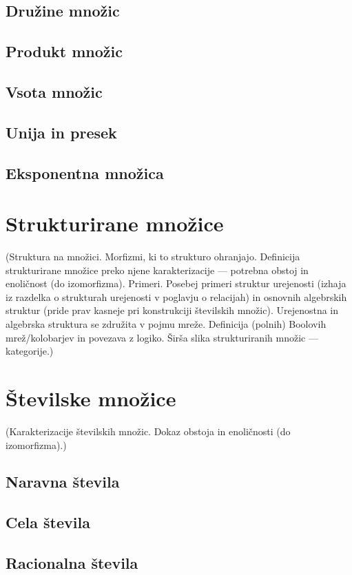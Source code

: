 \documentclass[11pt,a4paper,twoside]{book}
\newcommand{\note}[1]{{\small\textcolor{notecolor}{(#1)}}}
\begin{document}
		\section{Družine množic}
		\section{Produkt množic}
		\section{Vsota množic}
		\section{Unija in presek}
		\section{Eksponentna množica}
	
	
	
	
	\chapter{Strukturirane množice}
		\note{Struktura na množici. Morfizmi, ki to strukturo ohranjajo. Definicija strukturirane množice preko njene karakterizacije --- potrebna obstoj in enoličnost (do izomorfizma). Primeri. Posebej primeri struktur urejenosti (izhaja iz razdelka o strukturah urejenosti v poglavju o relacijah) in osnovnih algebrskih struktur (pride prav kasneje pri konstrukciji številskih množic). Urejenostna in algebrska struktura se združita v pojmu mreže. Definicija (polnih) Boolovih mrež/kolobarjev in povezava z logiko. Širša slika strukturiranih množic --- kategorije.}
	
	\chapter{Številske množice}
		\note{Karakterizacije številskih množic. Dokaz obstoja in enoličnosti (do izomorfizma).}
		\section{Naravna števila}
		\section{Cela števila}
		\section{Racionalna števila}
\end{document}
